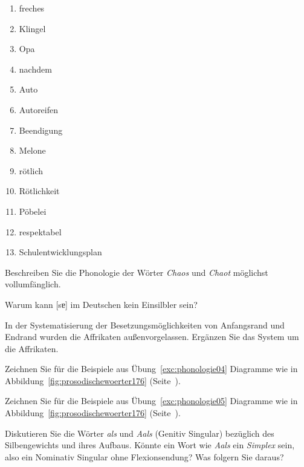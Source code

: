\begin{enumerate}
  \item freches
  \item Klingel
  \item Opa
  \item nachdem
  \item Auto
  \item Autoreifen
  \item Beendigung
  \item Melone
  \item rötlich
  \item Rötlichkeit
  \item Pöbelei
  \item respektabel
  \item Schulentwicklungsplan
\end{enumerate}

\Uebung[\tristar]{} \label{exc:phonologie06} Beschreiben Sie die Phonologie der Wörter \textit{Chaos} und \textit{Chaot} möglichst vollumfänglich.

 \label{exc:phonologie07} Warum kann [sɐ] im Deutschen kein Einsilbler sein?

\Uebung[\tristar]{} \label{exc:phonologie08} In der Systematisierung der Besetzungsmöglichkeiten von Anfangsrand und Endrand wurden die Affrikaten außenvorgelassen.
Ergänzen Sie das System um die Affrikaten.

\Uebung[\tristar]{} \label{exc:phonologie09} Zeichnen Sie für die Beispiele aus Übung~\ref{exc:phonologie04} Diagramme wie in Abbildung~\ref{fig:prosodischewoerter176} (Seite~\pageref{fig:prosodischewoerter176}).

\Uebung[\tristar]{} \label{exc:phonologie10} Zeichnen Sie für die Beispiele aus Übung~\ref{exc:phonologie05} Diagramme wie in Abbildung~\ref{fig:prosodischewoerter176} (Seite~\pageref{fig:prosodischewoerter176}).

\Uebung[\tristar]{} \label{exc:phonologie11} Diskutieren Sie die Wörter \textit{als} und \textit{Aals} (Genitiv Singular) bezüglich des Silbengewichts und ihres Aufbaus.
Könnte ein Wort wie \textit{Aals} ein \textit{Simplex} sein, also \zB ein Nominativ Singular ohne Flexionsendung?
Was folgern Sie daraus?

